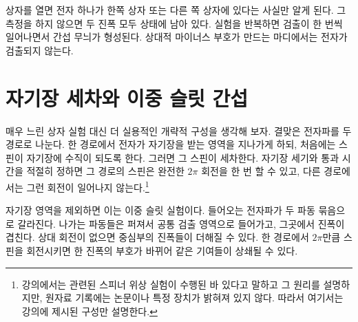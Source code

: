 \begin{classroomqa}
\end{classroomqa}

상자를 열면 전자 하나가 한쪽 상자 또는 다른 쪽 상자에 있다는 사실만 알게 된다. 그 측정을 하지 않으면 두 진폭 모두 상태에 남아 있다. 실험을 반복하면 검출이 한 번씩 일어나면서 간섭 무늬가 형성된다. 상대적 마이너스 부호가 만드는 마디에서는 전자가 검출되지 않는다.

\section{자기장 세차와 이중 슬릿 간섭}

매우 느린 상자 실험 대신 더 실용적인 개략적 구성을 생각해 보자. 결맞은 전자파를 두 경로로 나눈다. 한 경로에서 전자가 자기장을 받는 영역을 지나가게 하되, 처음에는 스핀이 자기장에 수직이 되도록 한다. 그러면 그 스핀이 세차한다. 자기장 세기와 통과 시간을 적절히 정하면 그 경로의 스핀은 완전한 \(2\pi\) 회전을 한 번 할 수 있고, 다른 경로에서는 그런 회전이 일어나지 않는다.\footnote{강의에서는 관련된 스피너 위상 실험이 수행된 바 있다고 말하고 그 원리를 설명하지만, 원자료 기록에는 논문이나 특정 장치가 밝혀져 있지 않다. 따라서 여기서는 강의에 제시된 구성만 설명한다.}

\begin{classroomqa}
\end{classroomqa}

\begin{classroomqa}
\end{classroomqa}

자기장 영역을 제외하면 이는 이중 슬릿 실험이다. 들어오는 전자파가 두 파동 묶음으로 갈라진다. 나가는 파동들은 퍼져서 공통 검출 영역으로 들어가고, 그곳에서 진폭이 겹친다. 상대 회전이 없으면 중심부의 진폭들이 더해질 수 있다. 한 경로에서 \(2\pi\)만큼 스핀을 회전시키면 한 진폭의 부호가 바뀌어 같은 기여들이 상쇄될 수 있다.

